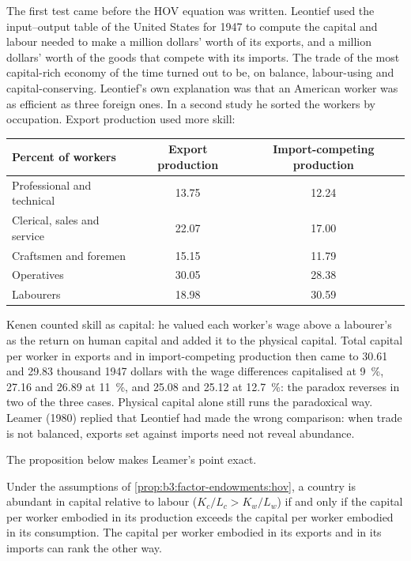 \begin{record}
The first test came before the HOV equation was written. Leontief used the
input--output table of the United States for 1947 to compute the capital and labour
needed to make a million dollars' worth of its exports, and a million dollars' worth
of the goods that compete with its imports. The trade of the most capital-rich
economy of the time turned out to be, on balance, labour-using and
capital-conserving. Leontief's own explanation was that an American worker was as
efficient as three foreign ones. %
In a second study he sorted the workers by occupation. Export production used more
skill: %
\begin{center}
\small
\begin{tabular}{lcc}
  Percent of workers & Export production & Import-competing production \\ \hline
  Professional and technical & 13.75 & 12.24 \\
  Clerical, sales and service & 22.07 & 17.00 \\
  Craftsmen and foremen & 15.15 & 11.79 \\
  Operatives & 30.05 & 28.38 \\
  Labourers & 18.98 & 30.59 \\ \hline
\end{tabular}
\end{center}
Kenen counted skill as capital: he valued each worker's wage above a labourer's as
the return on human capital and added it to the physical capital. Total capital per
worker in exports and in import-competing production then came to 30.61 and 29.83
thousand 1947 dollars with the wage differences capitalised at 9~\%, 27.16 and 26.89 at 11~\%, and
25.08 and 25.12 at 12.7~\%: the paradox reverses in two of the three cases. Physical capital alone
still runs the paradoxical way. %
Leamer (1980) replied that Leontief had made the wrong comparison: when trade is not
balanced, exports set against imports need not reveal abundance. %
\end{record}

The proposition below makes Leamer's point exact.

\begin{proposition}\label{prop:b3:factor-endowments:leamer}
Under the assumptions of \cref{prop:b3:factor-endowments:hov}, a country is abundant in
capital relative to labour ($K_c/L_c > K_w/L_w$) if and only if the capital per worker
embodied in its production exceeds the capital per worker embodied in its
consumption. The capital per worker embodied in its exports and in its imports can
rank the other way.
\end{proposition}

